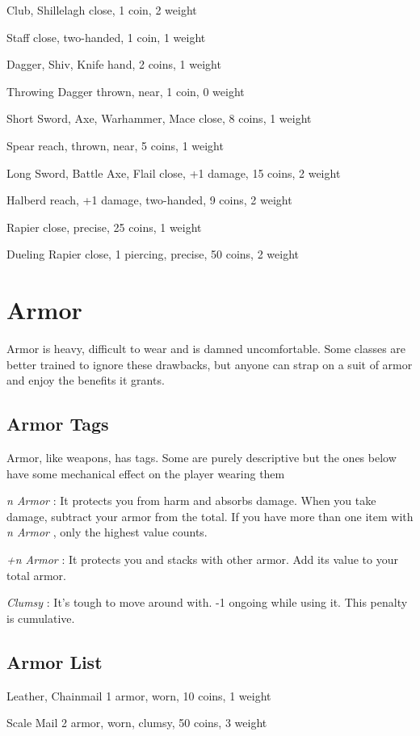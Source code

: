  Club, Shillelagh close, 1 coin, 2 weight


 Staff close, two-handed, 1 coin, 1 weight


 Dagger, Shiv, Knife hand, 2 coins, 1 weight


 Throwing Dagger thrown, near, 1 coin, 0 weight


 Short Sword, Axe, Warhammer, Mace close, 8 coins, 1 weight


 Spear reach, thrown, near, 5 coins, 1 weight


 Long Sword, Battle Axe, Flail close, +1 damage, 15 coins, 2 weight


 Halberd reach, +1 damage, two-handed, 9 coins, 2 weight


 Rapier close, precise, 25 coins, 1 weight


 Dueling Rapier close, 1 piercing, precise, 50 coins, 2 weight
\section*{Armor}


 Armor is heavy, difficult to wear and is damned uncomfortable. Some classes are better trained to ignore these drawbacks, but anyone can strap on a suit of armor and enjoy the benefits it grants.
\subsection{Armor Tags}


 Armor, like weapons, has tags. Some are purely descriptive but the ones below have some mechanical effect on the player wearing them


 \emph{n Armor}
: It protects you from harm and absorbs damage. When you take damage, subtract your armor from the total. If you have more than one item with \emph{n Armor}
, only the highest value counts. 


 \emph{+n Armor}
: It protects you and stacks with other armor. Add its value to your total armor.


 \emph{Clumsy}
: It's tough to move around with. -1 ongoing while using it. This penalty is cumulative.
\subsection{Armor List}


 Leather, Chainmail 1 armor, worn, 10 coins, 1 weight


 Scale Mail 2 armor, worn, clumsy, 50 coins, 3 weight


